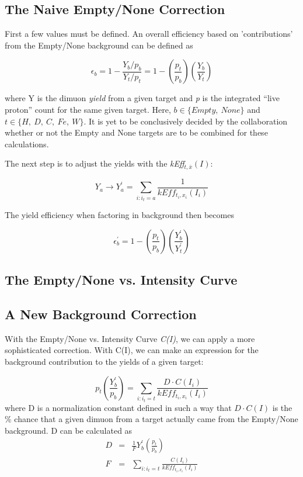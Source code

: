 \subsection{The Naive Empty/None Correction}

First a few values must be defined. An overall efficiency based on 'contributions' from the Empty/None background can be defined as

\begin{equation}
\epsilon_b = 1 - \frac{Y_b/p_b}{Y_t/p_t} = 1 - \left(\frac{p_t}{p_b}\right) \left( \frac{Y_b}{Y_t} \right)
\end{equation}

where Y is the dimuon \emph{yield} from a given target and \emph{p} is the integrated ``live proton'' count for the same given target. Here, $b \in \{Empty,\ None\}$ and $t\in\{H,\ D,\ C,\ Fe,\ W\}$. It is yet to be conclusively decided by the collaboration whether or not the Empty and None targets are to be combined for these calculations.

The next step is to adjust the yields with the \emph{kEff}$_{t,\bar{x}}(I)$:

\begin{equation}
Y_a \rightarrow Y_a^\prime = \sum_{i:i_t=a} \frac{1}{kEff_{t_i, x_i}(I_i)}
\end{equation}

The yield efficiency when factoring in background then becomes

\begin{equation}
\epsilon^\prime_b = 1 - \left(\frac{p_t}{p_b}\right) \left( \frac{Y^\prime_b}{Y^\prime_t} \right)
\end{equation}

\subsection{The Empty/None vs. Intensity Curve}


\subsection{A New Background Correction}

With the Empty/None vs. Intensity Curve \emph{C(I)}, we can apply a more sophisticated correction. With C(I), we can make an expression for the background contribution to the yields of a given target:

\begin{equation}
p_t \left( \frac{Y^\prime_b}{p_b} \right) = \sum_{i:i_t=t} \frac{D\cdot C(I_i)}{kEff_{t_i, x_i}(I_i)}
\end{equation}
where D is a normalization constant defined in such a way that $D \cdot C(I)$ is the \% chance that a given dimuon from a target actually came from the Empty/None background. D can be calculated as
\begin{eqnarray}
D & = & \frac{1}{F} Y^\prime_b \left( \frac{p_t}{p_b} \right) \\
F & = &\sum_{i: i_t=t} \frac{C(I_i)}{kEff_{t_i, x_i}(I_i)}
\end{eqnarray}

